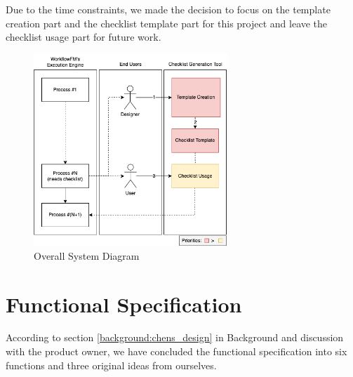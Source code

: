 Due to the time constraints, we made the decision to focus on the template creation part and the checklist template part for this project and leave the checklist usage part for future work.

\begin{figure}[ht!]
    \centering
    \includegraphics[width=0.65\textwidth]{overleaf/images/overall_system_diagram.png}
    \caption{Overall System Diagram}
    \label{fig:overall_system_diagram}
\end{figure}

\section{Functional Specification}
\label{functional_spec}
According to section \ref{background:chens_design} in Background and discussion with the product owner, we have concluded the functional specification into six functions and three original ideas from ourselves.

